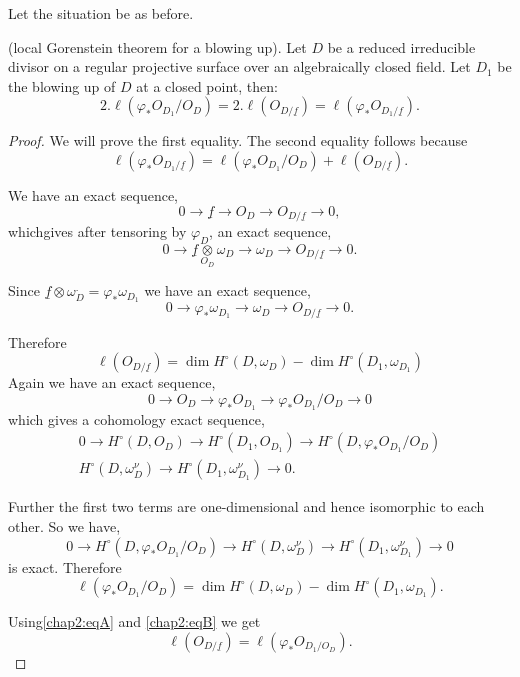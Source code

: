  Let the situation be as before.

\begin{THM*}
(local Gorenstein theorem for a blowing up). Let $D$ be a reduced
  irreducible divisor on a regular projective surface over an
  algebraically closed field. Let $D_1$ be the blowing up of $D$ at a
  closed point, then:
$$
2.\ell(\varphi_*O_{D_1}/O_D)=2.\ell(O_{D/\underline{f}})=\ell(\varphi_*
O_{D_1/\underline{f}}).
$$
\end{THM*} 

\begin{proof}
We will prove the first equality. The second equality follows because
$$
\ell(\varphi_*O_{D_1/\underline{f}})=\ell(\varphi_*O_{D_1}/O_D)+\ell 
(O_{D/\underline{f}}).
$$

We have an exact sequence,
$$
0\longrightarrow\underline{f}\longrightarrow O_D\longrightarrow
O_{D/\underline{f}}\longrightarrow 0,
$$
which\pageoriginale gives after tensoring by $\varphi_D$, an exact
sequence, 
$$
0\longrightarrow \underline{f}\underset{O_D}{\otimes}\omega_D
\longrightarrow \omega_D \longrightarrow O_{D/\underline{f}}
\longrightarrow 0.
$$

Since $\underline{f}\otimes\omega_D^.=\varphi_*\omega_{D_1}$ we have
an exact sequence,
$$
0\longrightarrow\varphi_*\omega_{D_1} \longrightarrow\omega_D
\longrightarrow O_{D/\underline{f}}\longrightarrow 0.
$$

Therefore
\begin{equation*}\label{chap2:eqA}
\ell(O_{D/\underline{f}})=\dim H^\circ(D,\omega_D)-\dim H^\circ
(D_1,\omega_{D_1})\tag{A}  
\end{equation*} 
Again we  have an exact sequence,
$$
0\longrightarrow O_D \longrightarrow\varphi_*O_{D_1}\longrightarrow
\varphi_* O_{D_1}/O_D\longrightarrow 0
$$
which gives a cohomology exact sequence,
\begin{equation*}
\begin{split}
0\longrightarrow H^\circ(D,O_D)\longrightarrow H^\circ(D_1,O_{D_1})
\longrightarrow H^\circ(D,\varphi_*O_{D_1}/O_D)\\
H^\circ(D,\omega_D^\nu)\longrightarrow H^\circ(D_1,\omega_{D_1}^\nu)
\longrightarrow 0.
\end{split}
\end{equation*}

Further the first two terms are one-dimensional and hence isomorphic
to each other. So we have,
$$
0 \longrightarrow H^\circ(D,\varphi_*O_{D_1}/O_D)\longrightarrow
H^\circ(D,\omega_D^\nu)\longrightarrow H^\circ(D_1,\omega_{D_1}^\nu)
\longrightarrow 0
$$
is exact. Therefore 
\begin{equation*}\label{chap2:eqB}
\ell(\varphi_*O_{D_1}/O_D)=\dim H^\circ(D,\omega_D)-\dim H^\circ
(D_1,\omega_{D_1}).\tag{B}
\end{equation*}

Using\pageoriginale \eqref{chap2:eqA} and \eqref{chap2:eqB} we get 
$$
\ell(O_{D/\underline{f}})=\ell(\varphi_*O_{D_1/O_D}).
$$
\end{proof}

